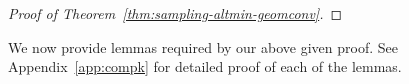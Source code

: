 \documentclass[11pt]{article}
\renewcommand{\eqref}[1]{\hyperref[#1]{(\ref*{#1})}}
\theoremstyle{plain}
\theoremstyle{definition}
\newcommand{\dist}{\mathrm{dist}}
\newcommand{\Vht}{\widehat{V}^{t+1}}
\newcommand{\Ut}{U^{t}}
\newcommand{\Vo}{V^*}
\newcommand{\amce}{AltMinComplete}
\begin{document}
\begin{proof}[Proof of Theorem~\ref{thm:sampling-altmin-geomconv}]
\end{proof}
We now provide lemmas required by our above given proof. See Appendix~\ref{app:compk} for detailed proof of each of the lemmas.%
\end{document}
